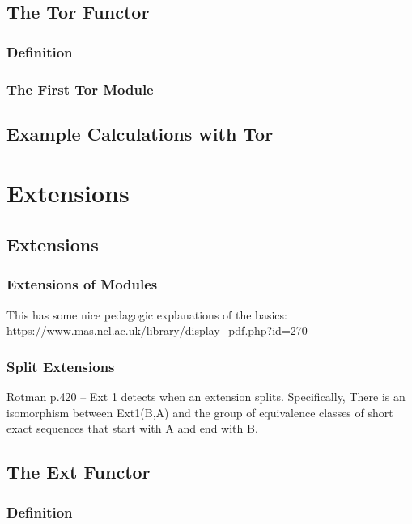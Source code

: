 \documentclass[oneside,english]{amsbook}
\numberwithin{section}{chapter}
\theoremstyle{plain}
\theoremstyle{definition}
\begin{document}
		\section{The Tor Functor}

			\subsection{Definition}

			\subsection{The First Tor Module}

		\section{Example Calculations with Tor}

	\chapter{Extensions}
	
		\section{Extensions}
			\subsection{Extensions of Modules}
			
				This has some nice pedagogic explanations of the basics: \url{https://www.mas.ncl.ac.uk/library/display_pdf.php?id=270}
			
			\subsection{Split Extensions}
				Rotman p.420 -- Ext 1 detects when an extension splits. Specifically, There is an isomorphism between Ext1(B,A)
				and the group of equivalence classes of short exact sequences that start with A and end with B.
		
		\section{The Ext Functor}

			\subsection{Definition}
			
\end{document}
